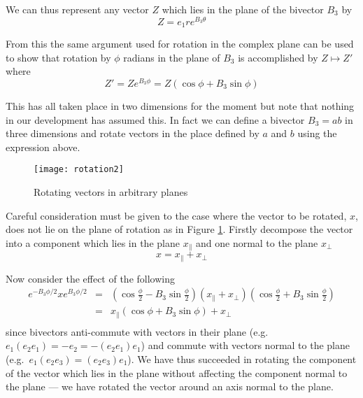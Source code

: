 We can thus represent any vector $Z$ which lies in the plane of the
bivector $B_3$ by
\[
Z=e_1re^{B_3\theta}
\]

From this the same argument used for rotation in the complex plane 
can be used to show that rotation by
$\phi$ radians in the plane of $B_3$ is accomplished by $Z \mapsto Z'$
where
\begin{displaymath}
Z' = Ze^{B_3\phi} = Z (\cos \phi + B_3 \sin \phi)
\end{displaymath}

This has all taken place in two dimensions for the moment but note that nothing
in our development has assumed this. In fact we can define a bivector $B_3 = ab$ in
three dimensions and rotate vectors in the place defined by $a$ and $b$ using
the expression above.

\begin{figure}
\centering
\texttt{[image: rotation2]}
\caption{Rotating vectors in arbitrary planes\label{fig:rotation2}}
\end{figure}

Careful consideration must be given to the case where the vector to be
rotated, $x$, does not lie on the plane of rotation as in Figure
\ref{fig:rotation2}. Firstly decompose the
vector into a component which lies in the plane $x_\parallel$ and one
normal to the plane $x_\perp$
\[
x = x_\parallel + x_\perp
\]

Now consider the effect of the following
\begin{eqnarray*}
e^{-B_3\phi/2}
x
e^{B_3\phi/2}
& = & \left(\cos \frac{\phi}{2} - B_3 \sin \frac{\phi}{2}\right)
(x_\parallel + x_\perp )
\left(\cos \frac{\phi}{2} + B_3 \sin \frac{\phi}{2}\right) \\
& = & x_\parallel (\cos \phi + B_3 \sin \phi) + x_\perp\\ 
\end{eqnarray*}
since bivectors anti-commute with vectors in their plane (e.g. 
$e_1(e_2e_1) = -e_2 = -(e_2e_1)e_1$) and commute with
vectors normal to the plane (e.g.\ $e_1(e_2e_3) = (e_2e_3)e_1$).
We have thus succeeded in rotating the component of the vector 
which lies in the plane without affecting the component normal
to the plane --- we have rotated the vector around an axis normal to
the plane.


